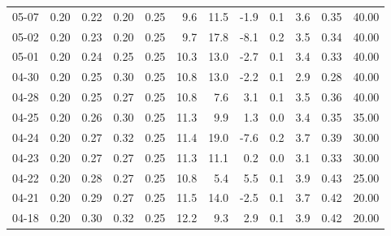 \begin{threeparttable}
{\begin{tabular}{lrrrrrrrrrrr}
  05-07 &          0.20 &          0.22 &          0.20 &        0.25 &                 9.6 &                11.5 &       -1.9 &                 0.1 &              3.6 &            0.35 &                  40.00 \\
  05-02 &          0.20 &          0.23 &          0.20 &        0.25 &                 9.7 &                17.8 &       -8.1 &                 0.2 &              3.5 &            0.34 &                  40.00 \\
  05-01 &          0.20 &          0.24 &          0.25 &        0.25 &                10.3 &                13.0 &       -2.7 &                 0.1 &              3.4 &            0.33 &                  40.00 \\
  04-30 &          0.20 &          0.25 &          0.30 &        0.25 &                10.8 &                13.0 &       -2.2 &                 0.1 &              2.9 &            0.28 &                  40.00 \\
  04-28 &          0.20 &          0.25 &          0.27 &        0.25 &                10.8 &                 7.6 &        3.1 &                 0.1 &              3.5 &            0.36 &                  40.00 \\
  04-25 &          0.20 &          0.26 &          0.30 &        0.25 &                11.3 &                 9.9 &        1.3 &                 0.0 &              3.4 &            0.35 &                  35.00 \\
  04-24 &          0.20 &          0.27 &          0.32 &        0.25 &                11.4 &                19.0 &       -7.6 &                 0.2 &              3.7 &            0.39 &                  30.00 \\
  04-23 &          0.20 &          0.27 &          0.27 &        0.25 &                11.3 &                11.1 &        0.2 &                 0.0 &              3.1 &            0.33 &                  30.00 \\
  04-22 &          0.20 &          0.28 &          0.27 &        0.25 &                10.8 &                 5.4 &        5.5 &                 0.1 &              3.9 &            0.43 &                  25.00 \\
  04-21 &          0.20 &          0.29 &          0.27 &        0.25 &                11.5 &                14.0 &       -2.5 &                 0.1 &              3.7 &            0.42 &                  20.00 \\
  04-18 &          0.20 &          0.30 &          0.32 &        0.25 &                12.2 &                 9.3 &        2.9 &                 0.1 &              3.9 &            0.42 &                  20.00 \\

\end{tabular}}
\end{threeparttable}
